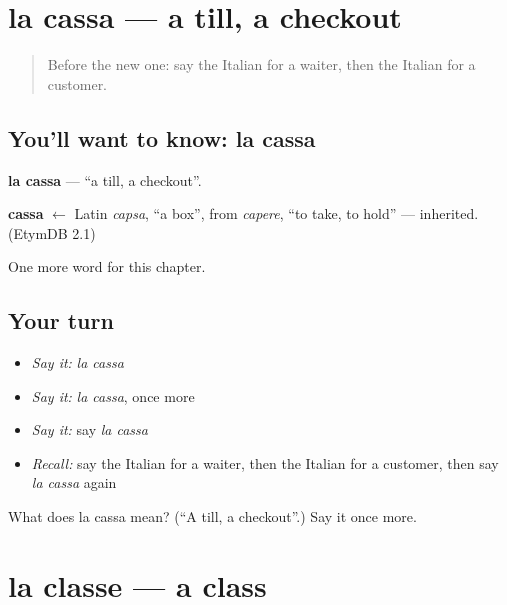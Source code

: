 \section[la cassa]{la cassa — a till, a checkout}

\label{lesson:IT-C113-cassa}



\begin{quote}
Before the new one: say the Italian for a waiter, then the Italian for a customer.
\end{quote}

\subsection*{You'll want to know: la cassa}
\textbf{la cassa} — \textquotedblleft{}a till, a checkout\textquotedblright{}.

\begin{cousinweb}
\textbf{cassa} $\leftarrow$ Latin \emph{capsa}, \textquotedblleft{}a box\textquotedblright{}, from \emph{capere}, \textquotedblleft{}to take, to hold\textquotedblright{} — inherited. (EtymDB 2.1)
\end{cousinweb}

\begin{grammarlens}[title={What you've built}]
One more word for this chapter.
\end{grammarlens}

\subsection*{Your turn}
\begin{itemize}
\raggedright
  \item \emph{Say it:} \emph{la cassa}
  \item \emph{Say it:} \emph{la cassa}, once more
  \item \emph{Say it:} say \emph{la cassa}
  \item \emph{Recall:} say the Italian for a waiter, then the Italian for a customer, then say \emph{la cassa} again
\end{itemize}

\begin{tcolorbox}[breakable,colback=teal!4,colframe=teal!35!black,title={Before you move on}]
What does la cassa mean? (\textquotedblleft{}A till, a checkout\textquotedblright{}.) Say it once more.
\end{tcolorbox}
\section[la classe]{la classe — a class}

